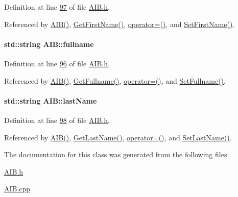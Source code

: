 Definition at line \hyperlink{_a_i_b_8h_source_l00097}{97} of file \hyperlink{_a_i_b_8h_source}{A\+I\+B.\+h}.



Referenced by \hyperlink{_a_i_b_8h_source_l00023}{A\+I\+B()}, \hyperlink{_a_i_b_8cpp_source_l00091}{Get\+First\+Name()}, \hyperlink{_a_i_b_8h_source_l00066}{operator=()}, and \hyperlink{_a_i_b_8cpp_source_l00087}{Set\+First\+Name()}.

\paragraph[{\texorpdfstring{fullname}{fullname}}]{\setlength{\rightskip}{0pt plus 5cm}std\+::string A\+I\+B\+::fullname\hspace{0.3cm}{\ttfamily [private]}}\hypertarget{class_a_i_b_a818b0cc283af23127c067fb3fc751058_a818b0cc283af23127c067fb3fc751058}{}\label{class_a_i_b_a818b0cc283af23127c067fb3fc751058_a818b0cc283af23127c067fb3fc751058}


Definition at line \hyperlink{_a_i_b_8h_source_l00096}{96} of file \hyperlink{_a_i_b_8h_source}{A\+I\+B.\+h}.



Referenced by \hyperlink{_a_i_b_8h_source_l00023}{A\+I\+B()}, \hyperlink{_a_i_b_8cpp_source_l00099}{Get\+Fullname()}, \hyperlink{_a_i_b_8h_source_l00066}{operator=()}, and \hyperlink{_a_i_b_8cpp_source_l00095}{Set\+Fullname()}.

\paragraph[{\texorpdfstring{last\+Name}{lastName}}]{\setlength{\rightskip}{0pt plus 5cm}std\+::string A\+I\+B\+::last\+Name\hspace{0.3cm}{\ttfamily [private]}}\hypertarget{class_a_i_b_ace7b8b648d1b44b7ee2f4be002952b7a_ace7b8b648d1b44b7ee2f4be002952b7a}{}\label{class_a_i_b_ace7b8b648d1b44b7ee2f4be002952b7a_ace7b8b648d1b44b7ee2f4be002952b7a}


Definition at line \hyperlink{_a_i_b_8h_source_l00098}{98} of file \hyperlink{_a_i_b_8h_source}{A\+I\+B.\+h}.



Referenced by \hyperlink{_a_i_b_8h_source_l00023}{A\+I\+B()}, \hyperlink{_a_i_b_8cpp_source_l00083}{Get\+Last\+Name()}, \hyperlink{_a_i_b_8h_source_l00066}{operator=()}, and \hyperlink{_a_i_b_8cpp_source_l00079}{Set\+Last\+Name()}.



The documentation for this class was generated from the following files\+:\begin{DoxyCompactItemize}
\item 
\hyperlink{_a_i_b_8h}{A\+I\+B.\+h}\item 
\hyperlink{_a_i_b_8cpp}{A\+I\+B.\+cpp}\end{DoxyCompactItemize}

